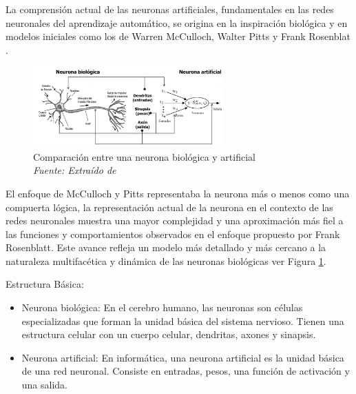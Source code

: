 La comprensión actual de las neuronas artificiales, fundamentales en las redes neuronales del aprendizaje automático, se origina en la inspiración biológica y en modelos iniciales como los de Warren McCulloch, Walter Pitts y Frank Rosenblat . 

\begin{figure}[h!]
	\centering
	\includegraphics[width=0.65\textwidth]{capitulo2/figuras/an5.png}
	\caption[Comparación entre una neurona biológica y  artificial]{Comparación entre una neurona biológica y  artificial
		\\\textit{Fuente: Extraído de} \protect\cite[p. 4]{lao2017procedimiento}}
	\label{fig:an5}

\end{figure}


El enfoque de McCulloch y Pitts representaba la neurona más  o menos como una compuerta lógica, la representación actual de la neurona en el contexto de las redes neuronales muestra una mayor complejidad y una aproximación más fiel a las funciones y comportamientos observados en el enfoque propuesto por Frank Rosenblatt. Este avance refleja un modelo más detallado y más cercano a la naturaleza multifacética y dinámica de las neuronas biológicas ver Figura \ref{fig:an5}.


Estructura Básica:
\begin{itemize}
	\item	 Neurona biológica: En el cerebro humano, las neuronas son células especializadas que forman la unidad básica del sistema nervioso. Tienen una estructura celular con un cuerpo celular, dendritas, axones y sinapsis.
	\item	Neurona artificial: En informática, una neurona artificial es la unidad básica de una red neuronal. Consiste en entradas, pesos, una función de activación y una salida.
\end{itemize}


